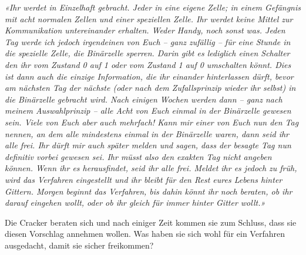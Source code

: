\textit{«Ihr werdet in Einzelhaft gebracht. Jeder in eine eigene Zelle; in einem
Gefängnis mit acht normalen Zellen und einer speziellen Zelle. Ihr werdet keine
Mittel zur Kommunikation untereinander erhalten. Weder Handy, noch sonst
was. Jeden Tag werde ich jedoch irgendeinen von Euch – ganz zufällig – für eine
Stunde in die spezielle Zelle, die Binärzelle sperren. Darin gibt es lediglich einen
Schalter den ihr vom Zustand 0 auf 1 oder vom Zustand 1 auf 0 umschalten
könnt. Dies ist dann auch die einzige Information, die ihr einander hinterlassen
dürft, bevor am nächsten Tag der nächste (oder nach dem Zufallsprinzip wieder
ihr selbst) in die Binärzelle gebracht wird. Nach einigen Wochen werden dann –
ganz nach meinem Auswahlprinzip – alle Acht von Euch einmal in der Binärzelle
gewesen sein. Viele von Euch aber auch mehrfach! Kann mir einer von Euch nun
den Tag nennen, an dem alle mindestens einmal in der Binärzelle waren, dann
seid ihr alle frei. Ihr dürft mir auch später melden und sagen, dass der besagte
Tag nun definitiv vorbei gewesen sei. Ihr müsst also den exakten Tag nicht
angeben können. Wenn ihr es herausfindet, seid ihr alle frei. Meldet ihr es
jedoch zu früh, wird das Verfahren eingestellt und ihr bleibt für den Rest eures
Lebens hinter Gittern. Morgen beginnt das Verfahren, bis dahin könnt ihr noch
beraten, ob ihr darauf eingehen wollt, oder ob ihr gleich für immer hinter Gitter
wollt.»}

Die Cracker beraten sich und nach einiger Zeit kommen sie zum Schluss, dass
sie diesen Vorschlag annehmen wollen. Was haben sie sich wohl für ein
Verfahren ausgedacht, damit sie sicher freikommen?

\TNTeop{}

